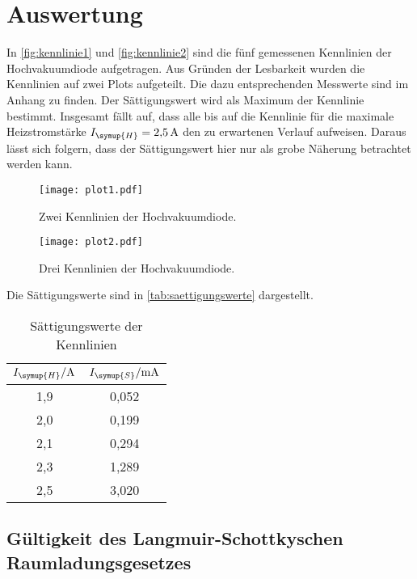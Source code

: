 \section{Auswertung}
\label{sec:Auswertung}
In \autoref{fig:kennlinie1} und \autoref{fig:kennlinie2} sind die fünf gemessenen Kennlinien der Hochvakuumdiode
aufgetragen. Aus Gründen der Lesbarkeit wurden die Kennlinien auf zwei Plots aufgeteilt. Die dazu entsprechenden
Messwerte sind im Anhang zu finden. Der Sättigungswert wird als Maximum der Kennlinie bestimmt. Insgesamt fällt
auf, dass alle bis auf die Kennlinie für die maximale Heizstromstärke $I_{\symup{H}}=\SI{2,5}{\ampere}$ den zu
erwartenen Verlauf aufweisen. Daraus lässt sich folgern, dass der Sättigungswert hier nur als grobe Näherung
betrachtet werden kann.
\begin{figure}
  \centering
  \texttt{[image: plot1.pdf]}
  \caption{Zwei Kennlinien der Hochvakuumdiode.}
  \label{fig:kennlinie1}
\end{figure}

\begin{figure}
  \centering
  \texttt{[image: plot2.pdf]}
  \caption{Drei Kennlinien der Hochvakuumdiode.}
  \label{fig:kennlinie2}
\end{figure}
Die Sättigungswerte sind in \autoref{tab:saettigungswerte} dargestellt.
\begin{table}
  \centering
  \caption{Sättigungswerte der Kennlinien}
  \label{tab:saettigungswerte}
  \begin{tabular}{c c}
    \toprule
    $I_{\symup{H}}/\si{\ampere}$ & $I_{\symup{S}}/\si{\milli\ampere}$ \\
    \midrule
    1,9 & 0,052 \\
    2,0 & 0,199 \\
    2,1 & 0,294 \\
    2,3 & 1,289 \\
    2,5 & 3,020 \\
    \bottomrule
  \end{tabular}
\end{table}

\subsection{Gültigkeit des Langmuir-Schottkyschen Raumladungsgesetzes}
\label{sec:Langmuir}